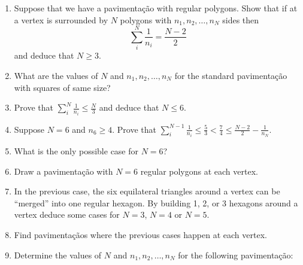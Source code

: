 \begin{enumerate}
\item Suppose that we have a pavimentação with regular polygons.
  Show that if at a vertex is surrounded by $N$ polygons with
  $n_1, n_2, \dots, n_N$ sides then
  $$\sum_{i}^N \frac{1}{n_i} = \frac{N-2}{2}$$
  and deduce that $N \geq 3$.
\item What are the values of $N$ and $n_1, n_2, \dots, n_N$ for the standard
  pavimentação with squares of same size?
\item Prove that $\sum_{i}^N \frac{1}{n_i} \leq \frac{N}{3}$ and deduce that
  $N \leq 6$.
\item Suppose $N=6$ and $n_6 \geq 4$. Prove that
  $\sum_{i}^{N-1} \frac{1}{n_i} \leq \frac{5}{3} < \frac{7}{4} \leq
  \frac{N-2}{2} - \frac{1}{n_N}$.
\item What is the only possible case for $N=6$?
\item Draw a pavimentação with $N=6$ regular polygons at each vertex.
\item In the previous case, the six equilateral triangles around a vertex can
  be ``merged'' into one regular hexagon. By building 1, 2, or 3 hexagons around
  a vertex deduce some cases for $N=3$, $N=4$ or $N=5$.
\item Find pavimentaçãos where the previous cases happen at each vertex.
\item Determine the values of $N$ and $n_1, n_2, \dots, n_N$ for the following
  pavimentação:


\end{enumerate}
